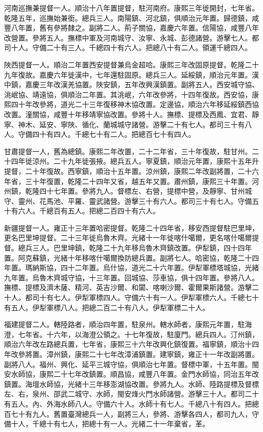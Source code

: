 \begin{pinyinscope}
河南巡撫兼提督一人。順治十八年置提督，駐河南府。康熙三年徙開封，七年省。乾隆五年，巡撫始兼銜。總兵三人。南陽鎮、河北鎮，俱順治元年置。歸德鎮，咸豐八年置，舊有參將隸之。副將二人。荊子關協，嘉慶六年置。信陽協，咸豐八年改營置。參將五人。撫標中軍及河南城守、汝寧、永城、彭德諸營。游擊七人。都司十人。守備二十有三人。千總四十有六人。把總八十有二人。領運千總四人。

陜西提督一人。順治二年置西安提督兼烏金超哈。康熙三年改固原提督。乾隆二十九年復故。嘉慶六年徙漢中，七年還駐固原。總兵三人。延綏鎮，順治元年置。漢中鎮，嘉慶三年改漢羌協置。陜安鎮，五年改興漢鎮置。副將五人。西安城守協、洮岷協、靖遠協，俱順治二年置。其洮岷，六年改參將，十四年復故。西安協，康熙四十年改參將，道光二十三年復移神木協改置。定邊協，順治六年移延綏鎮西協改置。潼關協，咸豐十年移靖寧協改置。參將十人。撫標、提標及西鳳、宜君、靜寧、神木、延安、寧陜、循化、蘭城城守諸營。游擊二十有七人。都司三十有八人。守備四十有四人。千總七十有二人。把總百七十有四人。

甘肅提督一人，舊為總鎮。康熙二年改置，二十二年省，三十年復故，駐甘州。二十四年徙涼州。二十九年徙張掖。總兵五人。寧夏鎮，順治元年置，康熙十五年升提督，二十年復故。西寧鎮，順治十五年置。涼州鎮，康熙二年改副將置，二十六年省，三十年復置，乾隆二十四年又省，越五年又置。肅州鎮，康熙三十年置。河州鎮，乾隆四十七年置。參將九人。督標左、右營，提標中營，及靜寧、甘州城守、靈州、花馬池、平羅、靈武諸營。游擊三十有六人。都司三十有七人。守備五十有六人。千總百有五人。把總二百四十有六人。

新疆提督一人。雍正十三年置哈密提督。乾隆二十四年省，移安西提督駐巴里坤，更名巴里坤提督。二十三年徙烏魯木齊。光緒十一年徙喀什噶爾，更名喀什噶爾提督。總兵三人。巴里坤鎮，乾隆二十九年移烏魯木齊鎮改置。伊犁鎮，四十四年置。阿克蘇鎮，光緒十年移喀什噶爾換防總兵置。副將七人。哈密協，乾隆二十四年置。瑪納斯協，四十二年置。烏什協，道光二十六年置。伊犁軍標塔城協，光緒九年置。烏魯木齊城守協，十三年置。回城協、莎車協，俱十四年置。參將八人。撫標、提標及濟木薩、精河、英吉沙爾、和闐、喀喇沙爾、霍爾果斯諸營。游擊二十人。都司十有七人。伊犁軍標四人。守備六十有一人。伊犁軍標六人。千總七十有五人。伊犁軍標八人。把總二百二十有八人。伊犁軍標二十人。

福建提督二人。轄陸路者，順治四年置，駐泉州。轄水師者，康熙元年置，駐海澄，七年省。十六年，以海澄公領之。十七年復故，駐廈門。總兵四人。汀州鎮，順治六年改左路總兵置，七年省，康熙三十六年改興化鎮復置。福寧鎮，順治十四年改參將置。漳州鎮，康熙二十七年改漳浦鎮置。建寧鎮，雍正十一年改副將置。副將八人。福州、興化、延平三城守協，俱順治七年置。督標中軍，十五年置。閩安水師協，康熙二十七年改鎮置。順昌協，咸豐八年置。金門水師協，同治五年改鎮置。海壇水師協，光緒十三年移澎湖協改置。參將九人。水師、陸路提標及督標左、右，泉州、邵武二城守、水師，閩安烽火門水師諸營。游擊三十人。都司二十有五人。內、外海水師八人。守備六十人。水師十有七人。千總八十有四人。把總百七十有九人。舊置臺灣總兵一人，副將三人，參將、游擊各四人，都司九人，守備十人，千總十有七人，把總十有一人。光緒二十一年棄省，革。


\end{pinyinscope}
